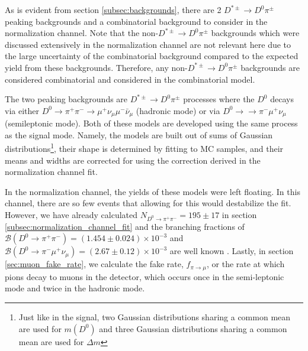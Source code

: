 As is evident from section \ref{subsec:backgrounds}, there are 2 $D^{*\pm} \to D^0 \pi^\pm$ peaking backgrounds and a combinatorial background to consider in the normalization channel. Note that the non-$D^{*\pm} \to D^0 \pi^\pm$ backgrounds which were discussed extensively in the normalization channel are not relevant here due to the large uncertainty of the combinatorial background compared to the expected yield from these backgrounds. Therefore, any non-$D^{*\pm} \to D^0 \pi^\pm$ backgrounds are considered combinatorial and considered in the combinatorial model.

The two peaking backgrounds are $D^{*\pm} \to D^0 \pi^\pm$ processes where the $D^0$ decays via either $D^0 \to \pi^+ \pi^- \to \mu^+ \nu_\mu \mu^- \bar{\nu}_\mu$ (hadronic mode) or via $D^0 \to \to \pi^- \mu^+ \nu_\mu$ (semileptonic mode). Both of these models are developed using the same process as the signal mode. Namely, the models are built out of sums of Gaussian distributions\footnote{Just like in the signal, two Gaussian distributions sharing a common mean are used for $m(D^0)$ and three Gaussian distributions sharing a common mean are used for $\Delta m$}, their shape is determined by fitting to MC samples, and their means and widths are corrected for using the correction derived in the normalization channel fit. 

In the normalization channel, the yields of these models were left floating. In this channel, there are so few events that allowing for this would destabilize the fit. However, we have already calculated $N_{D^0 \to \pi^+ \pi^-} = 195 \pm 17$ in section \ref{subsec:normalization_channel_fit} and the branching fractions of $\mathcal{B}(D^0 \to \pi^+ \pi^-) = (1.454 \pm 0.024) \times 10^{-3}$ and $\mathcal{B}(D^0 \to \pi^-\mu^+ \nu_\mu) = (2.67 \pm 0.12) \times 10^{-3}$ are well known \cite{ref:pdg2024}. Lastly, in section \ref{sec:muon_fake_rate}, we calculate the fake rate, $f_{\pi \to \mu}$, or the rate at which pions decay to muons in the detector, which occurs once in the semi-leptonic mode and twice in the hadronic mode.

